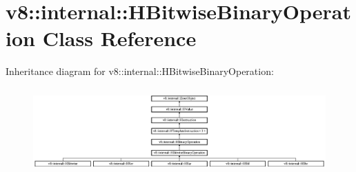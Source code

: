\hypertarget{classv8_1_1internal_1_1_h_bitwise_binary_operation}{}\section{v8\+:\+:internal\+:\+:H\+Bitwise\+Binary\+Operation Class Reference}
\label{classv8_1_1internal_1_1_h_bitwise_binary_operation}
Inheritance diagram for v8\+:\+:internal\+:\+:H\+Bitwise\+Binary\+Operation\+:\begin{figure}[H]
\begin{center}
\leavevmode
\includegraphics[height=3.322034cm]{classv8_1_1internal_1_1_h_bitwise_binary_operation}
\end{center}
\end{figure}
